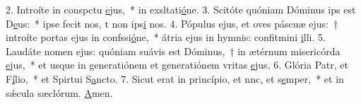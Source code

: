 2. Introíte in conspctu \uline{e}jus,~* in exsltati\uline{ó}ne.
3. Scitóte quóniam Dóminus ips est D\uline{e}us:~* ipse fecit nos, t non ips\uline{i} nos.
4. Pópulus ejus, et oves páscuæ ejus:~† introíte portas ejus in confssi\uline{ó}ne,~* átria ejus in hymnis: confitmini \uline{i}lli.
5. Laudáte nomen ejus: quóniam suávis est Dóminus,~† in ætérnum misericórda \uline{e}jus,~* et usque in generatiónem et generatiónem vritas \uline{e}jus.
6. Glória Patr, et F\uline{í}lio,~* et Spirtui S\uline{a}ncto.
7. Sicut erat in princípio, et nnc, et s\uline{e}mper,~* et in sǽcula sæclórum. \uline{A}men.
